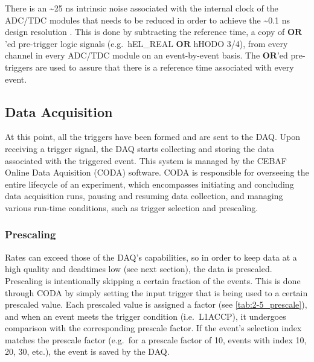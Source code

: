 \documentclass[
]{report}
\begin{document}


There is an \textasciitilde25 ns intrinsic noise associated with the
internal clock of the ADC/TDC modules that needs to be reduced in order
to achieve the \textasciitilde0.1 ns design resolution
\cite{yero_quick_2023}. This is done by subtracting the reference time,
a copy of \(\textbf{OR}\)'ed pre-trigger logic signals (e.g.~hEL\_REAL
\(\textbf{OR}\) hHODO 3/4), from every channel in every ADC/TDC module
on an event-by-event basis. The \(\textbf{OR}\)'ed pre-triggers are used
to assure that there is a reference time associated with every event.

\hypertarget{data-acquisition}{%
\subsection{Data Acquisition}\label{data-acquisition}}

At this point, all the triggers have been formed and are sent to the
DAQ. Upon receiving a trigger signal, the DAQ starts collecting and
storing the data associated with the triggered event. This system is
managed by the CEBAF Online Data Aquisition (CODA) software. CODA is
responsible for overseeing the entire lifecycle of an experiment, which
encompasses initiating and concluding data acquisition runs, pausing and
resuming data collection, and managing various run-time conditions, such
as trigger selection and prescaling.

\hypertarget{prescaling}{%
\subsubsection{Prescaling}\label{prescaling}}



Rates can exceed those of the DAQ's capabilities, so in order to keep
data at a high quality and deadtimes low (see next section), the data is
prescaled. Prescaling is intentionally skipping a certain fraction of
the events. This is done through CODA by simply setting the input
trigger that is being used to a certain prescaled value. Each prescaled
value is assigned a factor (see \ref{tab:2-5_prescale}), and when an
event meets the trigger condition (i.e.~L1ACCP), it undergoes comparison
with the corresponding prescale factor. If the event's selection index
matches the prescale factor (e.g.~for a prescale factor of 10, events
with index 10, 20, 30, etc.), the event is saved by the DAQ.
\end{document}
